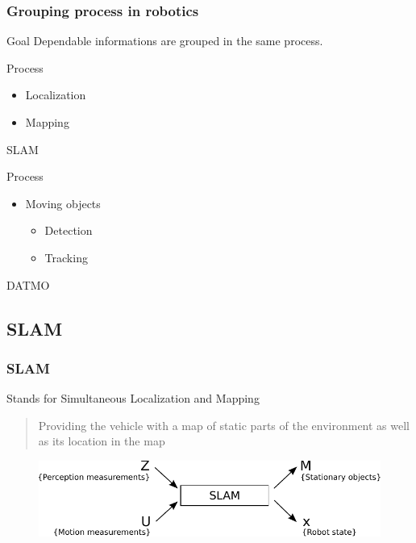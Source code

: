 \documentclass{beamer}
\begin{document}
	\begin{frame}
		\frametitle{Grouping process in robotics}
		
		\begin{block}{Goal}		
			Dependable informations are grouped in the same process.
		\end{block}			
		
		\begin{exampleblock}{Process}		
		
			\begin{itemize}
			\item Localization
			\item Mapping
			\end{itemize}			
		
			SLAM
		\end{exampleblock}					
				
		\begin{exampleblock}{Process}		
			\begin{itemize}
			\item Moving objects
				\begin{itemize}
				\item Detection
				\item Tracking
				\end{itemize}			
			\end{itemize}			
			DATMO
		\end{exampleblock}						
				
	\end{frame}

	\subsection{SLAM}
		\begin{frame}
			\frametitle{SLAM}
			
			\begin{block}{Stands for}				
				Simultaneous Localization and Mapping
			\end{block}
			
			\begin{quotation}
				Providing the vehicle with a map of static parts of the environment as well as its location in the map \cite{DBLP:journals/inffus/VuBA11}
			\end{quotation}			
			
			\begin{figure}[h]
				\center
				\includegraphics[scale=0.8]{../img/fig:perception:slam}
			 \end{figure}			
			
		\end{frame}
	
\end{document}
